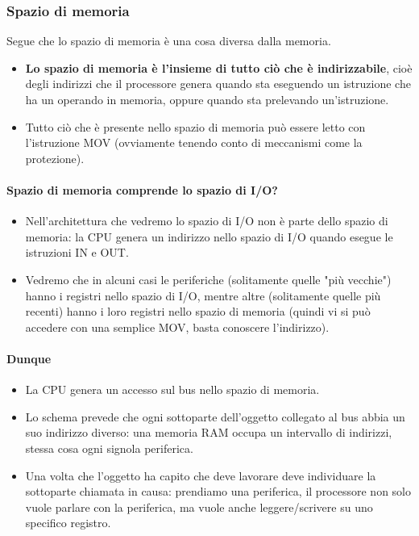 \documentclass[11pt]{report}
\theoremstyle{definition}
\begin{document}
\subsubsection{Spazio di memoria} Segue che lo spazio di memoria è una cosa diversa dalla memoria.
\begin{itemize}
\item \textbf{Lo spazio di memoria è l'insieme di tutto ciò che è indirizzabile}, cioè degli indirizzi che il processore genera quando sta eseguendo un istruzione che ha un operando in memoria, oppure quando sta prelevando un'istruzione.
\item Tutto ciò che è presente nello spazio di memoria può essere letto con l'istruzione MOV (ovviamente tenendo conto di meccanismi come la protezione).
\end{itemize}
\paragraph{Spazio di memoria comprende lo spazio di I/O?} 
\begin{itemize}
	\item Nell'architettura che vedremo lo spazio di I/O non è parte dello spazio di memoria: la CPU genera un indirizzo nello spazio di I/O quando esegue le istruzioni IN e OUT.
	\item Vedremo che in alcuni casi le periferiche (solitamente quelle "più vecchie") hanno i registri nello spazio di I/O, mentre altre (solitamente quelle più recenti) hanno i loro registri nello spazio di memoria (quindi vi si può accedere con una semplice MOV, basta conoscere l'indirizzo).
\end{itemize} 
\paragraph{Dunque}
\begin{itemize}
\item La CPU genera un accesso sul bus nello spazio di memoria.
\item Lo schema prevede che ogni sottoparte dell'oggetto collegato al bus abbia un suo indirizzo diverso: una memoria RAM occupa un intervallo di indirizzi, stessa cosa ogni signola periferica. 
\item Una volta che l'oggetto ha capito che deve lavorare deve individuare la sottoparte chiamata in causa: prendiamo una periferica, il processore non solo vuole parlare con la periferica, ma vuole anche leggere/scrivere su uno specifico registro.
\end{itemize}
\end{document}
